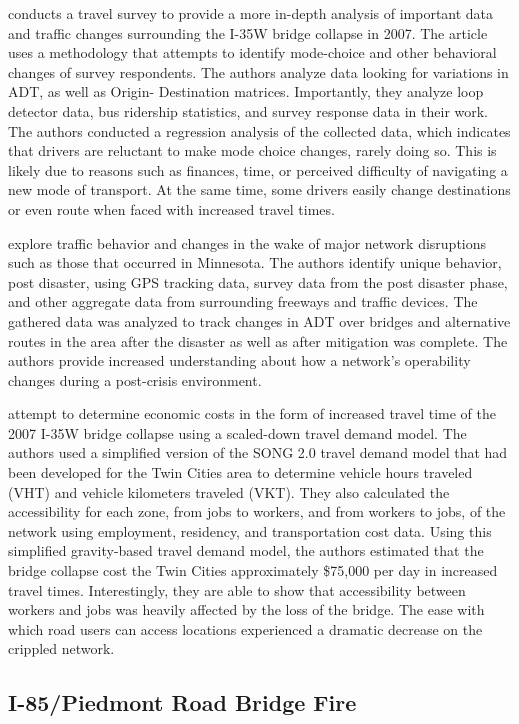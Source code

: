 \citet{zhu2010} conducts a travel survey to provide a more in-depth
analysis of important data
and traffic changes surrounding the I-35W bridge collapse in 2007. The
article uses a methodology
that attempts to identify mode-choice and other behavioral changes of
survey respondents. The
authors analyze data looking for variations in ADT, as well as Origin-
Destination matrices.
Importantly, they analyze loop detector data, bus ridership statistics, and survey response data in their work. The
authors conducted a regression analysis of the collected data,
which indicates that drivers are reluctant to make mode choice changes,
rarely doing so. This is
likely due to reasons such as finances, time, or perceived difficulty of
navigating a new mode of
transport. At the same time, some drivers easily change destinations or even route when faced
with increased travel
times.

\citet{levinson2010} explore traffic behavior and changes in the wake of
major network
disruptions such as those that occurred in Minnesota. The authors identify
unique behavior, post
disaster, using GPS tracking data, survey data from the post disaster
phase, and other aggregate
data from surrounding freeways and traffic devices. The gathered data was
analyzed to track
changes in ADT over bridges and alternative routes in the area after the
disaster as well as
after mitigation was complete. The authors provide increased
understanding about how a
network's operability changes during a post-crisis environment.

\citet{xie2011} attempt to determine economic costs in the form of
increased travel time
of the 2007 I-35W bridge collapse using a scaled-down travel demand model.
The authors used a
simplified version of the SONG 2.0 travel demand model that had been
developed for the Twin
Cities area to determine vehicle hours traveled (VHT) and vehicle
kilometers traveled (VKT). They
also calculated the accessibility for each zone, from jobs to workers, and
from workers to jobs, of
the network using employment, residency, and transportation cost data.
Using this simplified
gravity-based travel demand model, the authors estimated that the bridge collapse cost the Twin
Cities approximately
\$75,000 per day in increased travel times. Interestingly, they are able to
show that accessibility between workers and jobs was heavily affected by the
loss of the bridge. The ease with which road users can access locations
experienced a dramatic decrease on the crippled network.

\subsection{I-85/Piedmont Road Bridge Fire}

